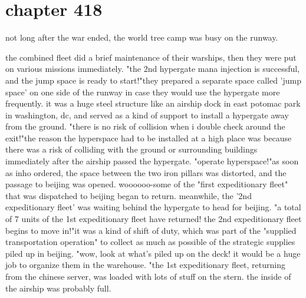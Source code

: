 \section{chapter 418}

not long after the war ended, the world tree camp was busy on the runway.





the combined fleet did a brief maintenance of their warships, then they were put on various missions immediately.
"the 2nd hypergate mana injection is successful, and the jump space is ready to start!"they prepared a separate space called 'jump space' on one side of the runway in case they would use the hypergate more frequently.
 it was a huge steel structure like an airship dock in east potomac park in washington, dc, and served as a kind of support to install a hypergate away from the ground.
"there is no risk of collision when i double check around the exit!"the reason the hyperspace had to be installed at a high place was because there was a risk of colliding with the ground or surrounding buildings immediately after the airship passed the hypergate.
"operate hyperspace!"as soon as inho ordered, the space between the two iron pillars was distorted, and the passage to beijing was opened.
woooooo-some of the "first expeditionary fleet" that was dispatched to beijing began to return.
meanwhile, the '2nd expeditionary fleet' was waiting behind the hypergate to head for beijing.
"a total of 7 units of the 1st expeditionary fleet have returned! the 2nd expeditionary fleet begins to move in!"it was a kind of shift of duty, which was part of the "supplied transportation operation" to collect as much as possible of the strategic supplies piled up in beijing.
"wow, look at what's piled up on the deck! it would be a huge job to organize them in the warehouse.
"the 1st expeditionary fleet, returning from the chinese server, was loaded with lots of stuff on the stern.
 the inside of the airship was probably full.

